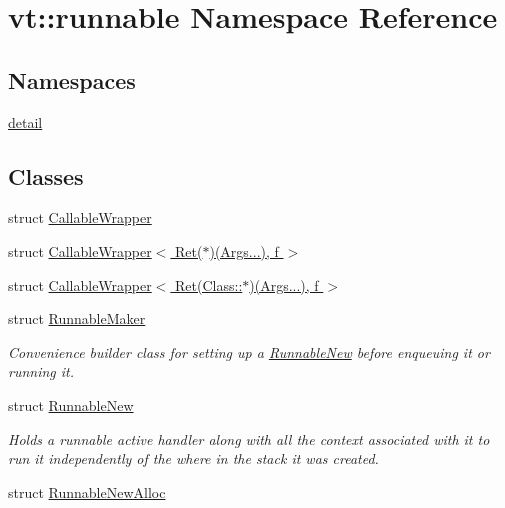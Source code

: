 \hypertarget{namespacevt_1_1runnable}{}\section{vt\+:\+:runnable Namespace Reference}
\label{namespacevt_1_1runnable}
\subsection*{Namespaces}
\begin{DoxyCompactItemize}
\item 
 \hyperlink{namespacevt_1_1runnable_1_1detail}{detail}
\end{DoxyCompactItemize}
\subsection*{Classes}
\begin{DoxyCompactItemize}
\item 
struct \hyperlink{structvt_1_1runnable_1_1_callable_wrapper}{Callable\+Wrapper}
\item 
struct \hyperlink{structvt_1_1runnable_1_1_callable_wrapper_3_01_ret_07_5_08_07_args_8_8_8_08_00_01f_01_4}{Callable\+Wrapper$<$ Ret($\ast$)(\+Args...), f $>$}
\item 
struct \hyperlink{structvt_1_1runnable_1_1_callable_wrapper_3_01_ret_07_class_1_1_5_08_07_args_8_8_8_08_00_01f_01_4}{Callable\+Wrapper$<$ Ret(\+Class\+::$\ast$)(\+Args...), f $>$}
\item 
struct \hyperlink{structvt_1_1runnable_1_1_runnable_maker}{Runnable\+Maker}
\begin{DoxyCompactList}\small\item\em Convenience builder class for setting up a {\ttfamily \hyperlink{structvt_1_1runnable_1_1_runnable_new}{Runnable\+New}} before enqueuing it or running it. \end{DoxyCompactList}\item 
struct \hyperlink{structvt_1_1runnable_1_1_runnable_new}{Runnable\+New}
\begin{DoxyCompactList}\small\item\em Holds a runnable active handler along with all the context associated with it to run it independently of the where in the stack it was created. \end{DoxyCompactList}\item 
struct \hyperlink{structvt_1_1runnable_1_1_runnable_new_alloc}{Runnable\+New\+Alloc}
\end{DoxyCompactItemize}

